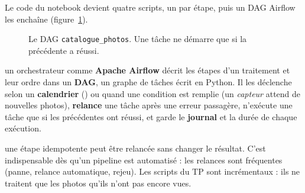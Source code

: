 Le code du notebook devient quatre scripts, un par étape, puis un DAG Airflow les enchaîne
(figure~\ref{c5:fig:dag}).

\begin{figure}[H]
\centering
{}
\caption{Le DAG \texttt{catalogue\_photos}. Une tâche ne démarre que si la précédente a réussi.}
\label{c5:fig:dag}
\end{figure}

\begin{notion}
un orchestrateur comme \textbf{Apache Airflow} décrit les étapes
d'un traitement et leur ordre dans un \textbf{DAG}, un graphe de tâches écrit en Python. Il les
déclenche selon un \textbf{calendrier} () ou quand une condition est remplie (un
\emph{capteur} attend de nouvelles photos), \textbf{relance} une tâche après une erreur passagère,
n'exécute une tâche que si les précédentes ont réussi, et garde le \textbf{journal} et la durée de
chaque exécution.
\end{notion}

\begin{notion}[Idempotence]
une étape idempotente peut être relancée sans changer le résultat. C'est
indispensable dès qu'un pipeline est automatisé : les relances sont fréquentes (panne, relance
automatique, rejeu). Les scripts du TP sont incrémentaux : ils ne traitent que les photos qu'ils
n'ont pas encore vues.
\end{notion}

